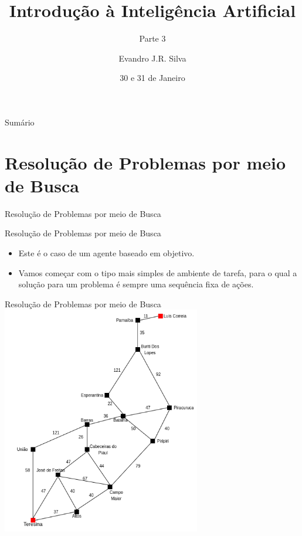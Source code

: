 \documentclass{libs/ufc_format}
\title[Introdução a IA]{\huge\textbf{Introdução à Inteligência Artificial}}
\subtitle{Parte 3}
\author{Evandro J.R. Silva}
\institute[Estácio Teresina]{
    \normalsize{\email{ejrs.profissional@gmail.com}}
    \newline
    \newline
    \estaciothe
}
\date{30 e 31 de Janeiro}
\begin{document}


\begin{frame}{}
    \maketitle
\end{frame}

\begin{frame}{Sumário}
    \begin{multicols}{2}
        \tableofcontents
    \end{multicols}
\end{frame}

\section{Resolução de Problemas por meio de Busca}

\begin{frame}{}
    \centering
    \Large
    Resolução de Problemas por meio de Busca
\end{frame}

\begin{frame}{Resolução de Problemas por meio de Busca}
    \begin{itemize}
        \justifying
        \item Este é o caso de um agente baseado em objetivo.
        \item Vamos começar com o tipo mais simples de ambiente de tarefa, para o qual a solução para um problema é sempre uma sequência fixa de ações.
    \end{itemize}
\end{frame}

\begin{frame}{Resolução de Problemas por meio de Busca}
    \centering
    \includegraphics[width=0.65\textwidth]{figuras/problema01}
\end{frame}
\end{document}
